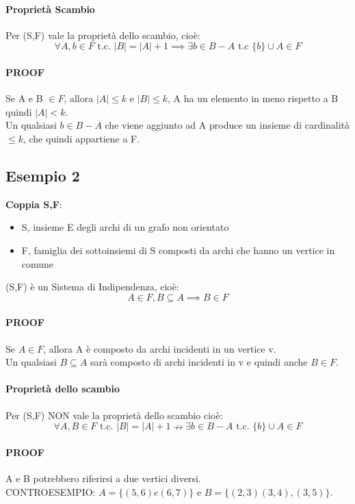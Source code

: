 \paragraph*{Proprietà Scambio} Per (S,F) vale la proprietà dello scambio, cioè:\\
\[ \forall A,b \in F \text{ t.c. } |B| = |A|+1 \implies \exists b \in B-A \text{ t.c } \{b\} \cup A \in F\]
\paragraph*{PROOF}
Se A e B $\in F$, allora $|A| \leq k$ e $|B| \leq k$, A ha un elemento in meno rispetto a B
quindi $|A| < k$.\\
Un qualsiasi $b \in B-A$ che viene aggiunto ad A produce un insieme di cardinalità $\leq k$,
che quindi appartiene a F.
\subsection{Esempio 2}
\textbf{Coppia S,F}:
\begin{itemize}
    \item S, insieme E degli archi di un grafo non orientato
    \item F, famiglia dei sottoinsiemi di S composti da archi che hanno un vertice in comune
\end{itemize}
(S,F) è un Sistema di Indipendenza, cioè:\\
\[A \in F, B \subseteq A \implies B \in F\]
\paragraph*{PROOF} Se $A \in F$, allora A è composto da archi incidenti in un vertice v.\\
Un qualsiasi $B \subseteq A$ sarà composto di archi incidenti in v e quindi anche $B \in F$.
\paragraph*{Proprietà dello scambio} Per (S,F) NON vale la proprietà dello scambio cioè:
\[ \forall A,B \in F \text{ t.c. } |B|=|A|+1 \nrightarrow \exists b \in B-A \text{ t.c. } \{b\} \cup A \in F\]
\paragraph*{PROOF} A e B potrebbero riferirsi a due vertici diversi.\\
CONTROESEMPIO: $A = \{(5,6) e (6,7)\}$ e $B = \{(2,3)(3,4),(3,5)\}$.
